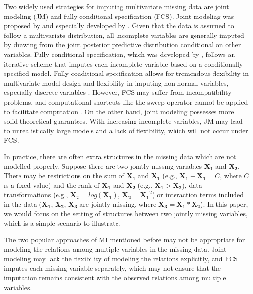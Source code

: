 	Two widely used strategies for imputing multivariate missing data are joint modeling (JM) and fully conditional specification (FCS). Joint modeling was proposed by \citet{RubinD1987} and especially developed by \citet{schafer1997analysis}. Given that the data is assumed to follow a multivariate distribution, all incomplete variables are generally imputed by drawing from the joint posterior predictive distribution conditional on other variables. Fully conditional specification, which was developed by \citet{van2007multiple}, follows an iterative scheme that imputes each incomplete variable based on a conditionally specified model. Fully conditional specification allows for tremendous flexibility in multivariate model design and flexibility in imputing non-normal variables, especially discrete variables \citep{goldstein2014fitting}. However, FCS may suffer from incompatibility problems, and computational shortcuts like the sweep operator cannot be applied to facilitate computation \citep{Buuren2018}. On the other hand, joint modeling possesses more solid theoretical guarantees. With increasing incomplete variables, JM may lead to unrealistically large models and a lack of flexibility, which will not occur under FCS.  
	
	In practice, there are often extra structures in the missing data which are not modelled properly. Suppose there are two jointly missing variables $\boldsymbol{X_1}$ and $\boldsymbol{X_2}$. There may be restrictions on the sum of $\boldsymbol{X_1}$ and $\boldsymbol{X_1}$ (e.g., $\boldsymbol{X_1} + \boldsymbol{X_1} = C$, where $C$ is a fixed value) and the rank of $\boldsymbol{X_1}$ and $\boldsymbol{X_2}$ (e.g., $\boldsymbol{X_1} > \boldsymbol{X_2}$), data transformations (e.g., $\boldsymbol{X_2} = log(\boldsymbol{X_1})$, $\boldsymbol{X_2} = \boldsymbol{X_1}^2$) or interaction terms included in the data ($\boldsymbol{X_1}$, $\boldsymbol{X_2}$, $\boldsymbol{X_3}$ are jointly missing, where $\boldsymbol{X_3} = \boldsymbol{X_1} * \boldsymbol{X_2}$). In this paper, we would focus on the setting of structures between two jointly missing variables, which is a simple scenario to illustrate.  
	
	The two popular approaches of MI mentioned before may not be appropriate for modeling the relations among multiple variables in the missing data. Joint modeling may lack the flexibility of modeling the relations explicitly, and FCS imputes each missing variable separately, which may not ensure that the imputation remains consistent with the observed relations among multiple variables. 
	
